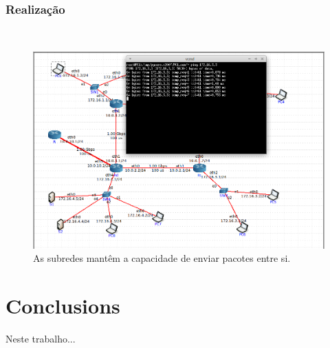 \documentclass{llncs}
\begin{document}
\subsubsection{Realização}\rule[-10pt]{0pt}{10pt}\\ 


\begin{figure}
	\begin{center}
	\includegraphics[scale=0.35]{./imagens/exercicio3_3.png} 
	\end{center}
	\caption{\label{fig:ping}As subredes mantêm a capacidade de enviar pacotes entre si.}
\end{figure} 



\section{Conclusions}
Neste trabalho...



\end{document}
